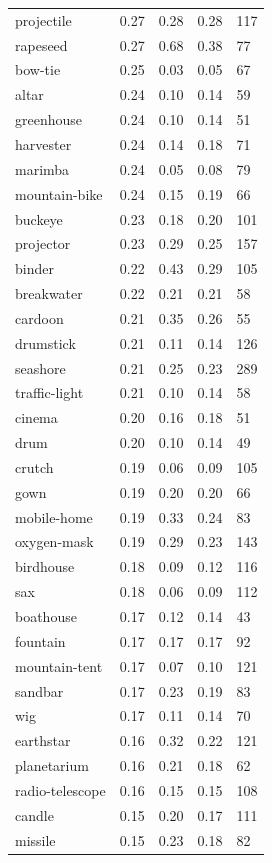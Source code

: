 \begin{center}
\begin{longtable}{lllll}
projectile & 0.27 & 0.28 & 0.28 & 117 \\
rapeseed & 0.27 & 0.68 & 0.38 & 77 \\
bow-tie & 0.25 & 0.03 & 0.05 & 67 \\
altar & 0.24 & 0.10 & 0.14 & 59 \\
greenhouse & 0.24 & 0.10 & 0.14 & 51 \\
harvester & 0.24 & 0.14 & 0.18 & 71 \\
marimba & 0.24 & 0.05 & 0.08 & 79 \\
mountain-bike & 0.24 & 0.15 & 0.19 & 66 \\
buckeye & 0.23 & 0.18 & 0.20 & 101 \\
projector & 0.23 & 0.29 & 0.25 & 157 \\
binder & 0.22 & 0.43 & 0.29 & 105 \\
breakwater & 0.22 & 0.21 & 0.21 & 58 \\
cardoon & 0.21 & 0.35 & 0.26 & 55 \\
drumstick & 0.21 & 0.11 & 0.14 & 126 \\
seashore & 0.21 & 0.25 & 0.23 & 289 \\
traffic-light & 0.21 & 0.10 & 0.14 & 58 \\
cinema & 0.20 & 0.16 & 0.18 & 51 \\
drum & 0.20 & 0.10 & 0.14 & 49 \\
crutch & 0.19 & 0.06 & 0.09 & 105 \\
gown & 0.19 & 0.20 & 0.20 & 66 \\
mobile-home & 0.19 & 0.33 & 0.24 & 83 \\
oxygen-mask & 0.19 & 0.29 & 0.23 & 143 \\
birdhouse & 0.18 & 0.09 & 0.12 & 116 \\
sax & 0.18 & 0.06 & 0.09 & 112 \\
boathouse & 0.17 & 0.12 & 0.14 & 43 \\
fountain & 0.17 & 0.17 & 0.17 & 92 \\
mountain-tent & 0.17 & 0.07 & 0.10 & 121 \\
sandbar & 0.17 & 0.23 & 0.19 & 83 \\
wig & 0.17 & 0.11 & 0.14 & 70 \\
earthstar & 0.16 & 0.32 & 0.22 & 121 \\
planetarium & 0.16 & 0.21 & 0.18 & 62 \\
radio-telescope & 0.16 & 0.15 & 0.15 & 108 \\
candle & 0.15 & 0.20 & 0.17 & 111 \\
missile & 0.15 & 0.23 & 0.18 & 82 \\

\end{longtable}
\end{center}
